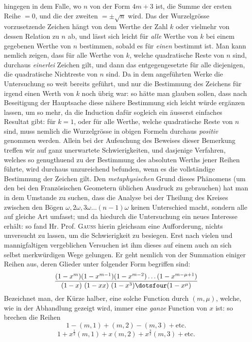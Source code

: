 hingegen in dem Falle, wo $n$ von der Form $4m+3$ ist, die Summe der ersten Reihe $=0$, und die der zweiten $=\pm\surd n$ wird. Das der Wurzelgrösse vorzusetzende Zeichen hängt von dem Werthe der Zahl $k$ oder vielmehr von dessen Relation zu $n$ ab, und lässt sich leicht für \emph{alle} Werthe von $k$ bei einem gegebenen Werthe von $n$ bestimmen, sobald es für \emph{einen} bestimmt ist. Man kann nemlich zeigen, dass für alle Werthe von $k$, welche quadratische Reste von $n$ sind, durchaus \emph{einerlei} Zeichen gilt, und dann das entgegengesetzte für alle diejenigen, die quadratische Nichtreste von $n$ sind. Da in dem angeführten Werke die Untersuchung so weit bereits geführt, und nur die Bestimmung des Zeichens für irgend einen Werth von $k$ noch übrig war: so hätte man glauben sollen, dass nach Beseitigung der Hauptsache diese nähere Bestimmung sich leicht würde ergänzen lassen, um so mehr, da die Induction dafür sogleich ein äusserst einfaches Resultat gibt: für $k=1$, oder für alle Werthe, welche quadratische Reste von $n$ sind, muss nemlich die Wurzelgrösse in obigen Formeln durchaus \emph{positiv} genommen werden. Allein bei der Aufsuchung des Beweises dieser Bemerkung treffen wir auf ganz unerwartete Schwierigkeiten, und dasjenige Verfahren, welches so genugthuend zu der Bestimmung des absoluten Werths jener Reihen führte, wird durchaus unzureichend befunden, wenn es die vollständige Bestimmung der Zeichen gilt. Den \emph{metaphysischen} Grund dieses Phänomens (um den bei den Französischen Geometern üblichen Ausdruck zu gebrauchen) hat man in dem Umstande zu suchen, dass die Analyse bei der Theilung des Kreises zwischen den Bögen $\omega,2\omega,3\omega\ldots(n-1)\omega$ keinen Unterschied macht, sondern alle auf gleiche Art umfasst; und da hiedurch die Untersuchung ein neues Interesse erhält: so fand Hr. Prof. \textsc{Gauss} hierin gleichsam eine Aufforderung, nichts unversucht zu lassen, um die Schwierigkeit zu besiegen. Erst nach vielen und mannigfaltigen vergeblichen Versuchen ist ihm dieses auf einem auch an sich selbst merkwürdigen Wege gelungen. Er geht nemlich von der Summation einiger Reihen aus, deren Glieder unter folgender Form begriffen sind:
\[
\frac{(1-x^m)(1-x^{m-1})(1-x^{m-2})\ldots(1-x^{m-\mu+1})}{(1-x)\ (1-xx)\ (1-x^3)\dotsfour(1-x^\mu)}
\]
Bezeichnet man, der Kürze halber, eine solche Function durch $(m,\mu)$, welche, wie in der Abhandlung gezeigt wird, immer eine \emph{ganze} Function von $x$ ist: so brechen die Reihen
%
\[
1-(m,1)+(m,2)-(m,3)+\text{etc.}
\]
\[
1+x^{\frac12}(m,1)+x(m,2)+x^{\frac32}(m,3)+\text{etc.}
\]
